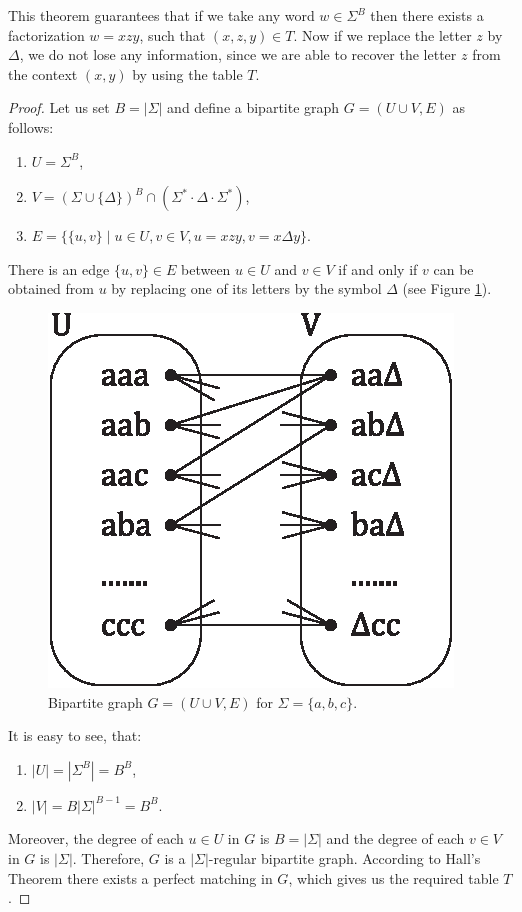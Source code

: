 This theorem guarantees that if we take any word $w \in \Sigma^B$ then there exists a factorization $w = xzy$, such that $(x, z, y) \in T$. Now if we replace the letter $z$ by $\Delta$, we do not lose any information, since we are able to recover the letter $z$ from the context $(x, y)$ by using the table $T$.

\begin{proof}
Let us set $B = |\Sigma|$ and define a bipartite graph $G = (U \cup V, E)$ as follows:
\begin{enumerate}
\item $U = \Sigma^B$,
\item $V = (\Sigma \cup \{\Delta\})^B \cap (\Sigma^* \cdot \Delta \cdot \Sigma^*)$,
\item $E = \{ \{u, v\} \mid u \in U, v \in V, u = xzy, v = x \Delta y\}$.
\end{enumerate}
There is an edge $\{u, v\} \in E$ between $u \in U$ and $v \in V$ if and only if $v$ can be obtained from $u$ by replacing one of its letters by the symbol $\Delta$ (see Figure \ref{figure:graph}).
\begin{figure}[htp]
\centering
\includegraphics[scale=1.0]{img/graph.eps}
\caption[Bipartite graph $G = (U \cup V, E)$ for $\Sigma = \{a, b, c\}$.]
{Bipartite graph $G = (U \cup V, E)$ for $\Sigma = \{a, b, c\}$.}
\label{figure:graph}
\end{figure}
It is easy to see, that:
\begin{enumerate}
\item $|U| = |\Sigma^B| = B^B$,
\item $|V| = B |\Sigma|^{B-1} = B^B$.
\end{enumerate}
Moreover, the degree of each $u \in U$ in $G$ is $B = |\Sigma|$ and the degree of each $v \in V$ in $G$ is $|\Sigma|$. Therefore, $G$ is a $|\Sigma|$-regular bipartite graph. According to Hall's Theorem \cite{Hall1935} there exists a perfect matching in $G$, which gives us the required table $T$.
\end{proof}

